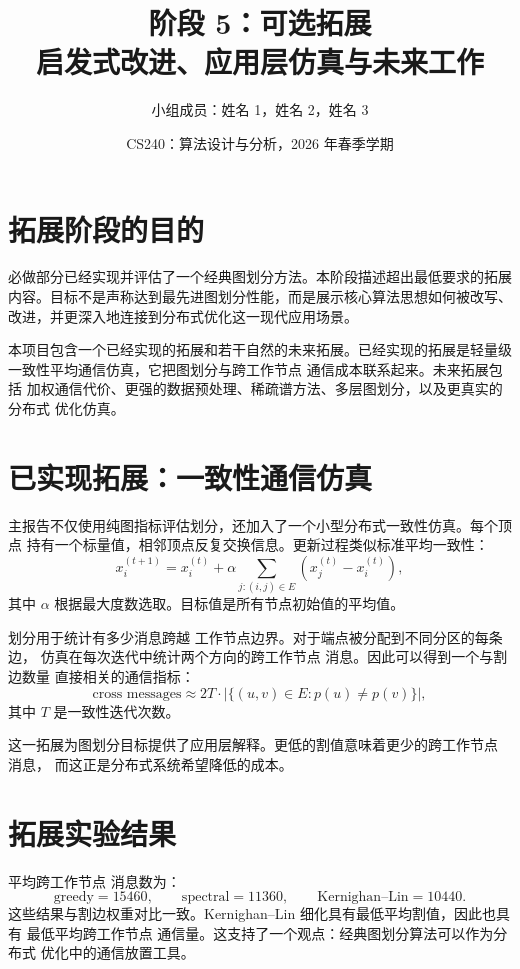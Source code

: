 \documentclass[UTF8, 11pt]{ctexart}
\title{\textbf{阶段 5：可选拓展}\\
启发式改进、应用层仿真与未来工作}
\author{小组成员：姓名 1，姓名 2，姓名 3}
\date{CS240：算法设计与分析，2026 年春季学期}
\begin{document}
\maketitle

\section{拓展阶段的目的}

必做部分已经实现并评估了一个经典图划分方法。本阶段描述超出最低要求的拓展
内容。目标不是声称达到最先进图划分性能，而是展示核心算法思想如何被改写、
改进，并更深入地连接到分布式优化这一现代应用场景。

本项目包含一个已经实现的拓展和若干自然的未来拓展。已经实现的拓展是轻量级
一致性平均通信仿真，它把图划分与跨工作节点 通信成本联系起来。未来拓展包括
加权通信代价、更强的数据预处理、稀疏谱方法、多层图划分，以及更真实的分布式
优化仿真。

\section{已实现拓展：一致性通信仿真}

主报告不仅使用纯图指标评估划分，还加入了一个小型分布式一致性仿真。每个顶点
持有一个标量值，相邻顶点反复交换信息。更新过程类似标准平均一致性：
\[
    x_i^{(t+1)}
    =
    x_i^{(t)}
    +
    \alpha
    \sum_{j:(i,j)\in E}
    \left(x_j^{(t)}-x_i^{(t)}\right),
\]
其中 $\alpha$ 根据最大度数选取。目标值是所有节点初始值的平均值。

划分用于统计有多少消息跨越 工作节点边界。对于端点被分配到不同分区的每条边，
仿真在每次迭代中统计两个方向的跨工作节点 消息。因此可以得到一个与割边数量
直接相关的通信指标：
\[
    \text{cross messages}
    \approx
    2T \cdot |\{(u,v)\in E:p(u)\neq p(v)\}|,
\]
其中 $T$ 是一致性迭代次数。

这一拓展为图划分目标提供了应用层解释。更低的割值意味着更少的跨工作节点 消息，
而这正是分布式系统希望降低的成本。

\section{拓展实验结果}

平均跨工作节点 消息数为：
\[
    \text{greedy}=15460,\qquad
    \text{spectral}=11360,\qquad
    \text{Kernighan--Lin}=10440.
\]
这些结果与割边权重对比一致。Kernighan--Lin 细化具有最低平均割值，因此也具有
最低平均跨工作节点 通信量。这支持了一个观点：经典图划分算法可以作为分布式
优化中的通信放置工具。
\end{document}
